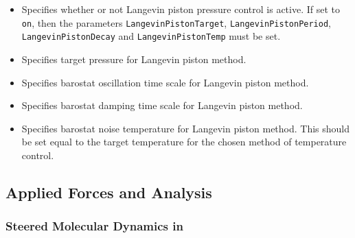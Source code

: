 \begin{itemize}

\item
{}
{Specifies whether or not Langevin piston pressure control is active.  
If set to \verb!on!, then the parameters \verb!LangevinPistonTarget!, \verb!LangevinPistonPeriod!, \verb!LangevinPistonDecay! and \verb!LangevinPistonTemp! must be set.}

\item
{}
{Specifies target pressure for Langevin piston method.}

\item
{}
{Specifies barostat oscillation time scale for Langevin piston method.}

\item
{}
{Specifies barostat damping time scale for Langevin piston method.}

\item
{}
{Specifies barostat noise temperature for Langevin piston method.
This should be set equal to the target temperature for the chosen method of temperature control.}

\end{itemize}

\subsection{Applied Forces and Analysis}

\subsubsection{Steered Molecular Dynamics in \NAMD}

